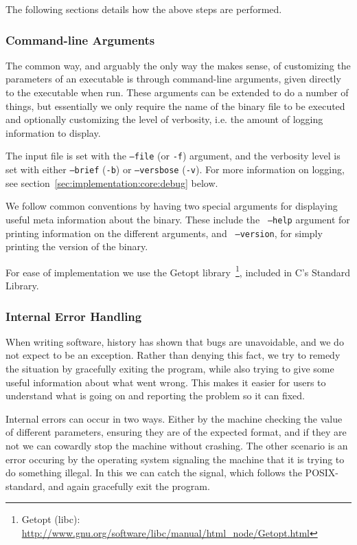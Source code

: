 The following sections details how the above steps are performed.

\subsubsection{Command-line Arguments}
The common way, and arguably the only way the makes sense, of customizing the
parameters of an executable is through command-line arguments, given directly to
the executable when run. These arguments can be extended to do a number of
things, but essentially we only require the name of the binary file to be
executed and optionally customizing the level of verbosity, i.e. the amount of
logging information to display. %

The input file is set with the {\tt --file} (or {\tt -f}) argument, and the
verbosity level is set with either {\tt --brief} ({\tt -b}) or {\tt--versbose}
({\tt -v}). For more information on logging, see
section~\ref{sec:implementation:core:debug} below.

We follow common conventions by having two special arguments for displaying
useful meta information about the \thename{} binary. These include the {\tt
  --help} argument for printing information on the different arguments, and {\tt
  --version}, for simply printing the version of the binary.

For ease of implementation we use the Getopt library~\footnote{Getopt (libc):
  \url{http://www.gnu.org/software/libc/manual/html_node/Getopt.html}}, included
in C's Standard Library.

\subsubsection{Internal Error Handling}

When writing software, history has shown that bugs are unavoidable, and we do
not expect \thename{} to be an exception. Rather than denying this fact, we try
to remedy the situation by gracefully exiting the program, while also trying to
give some useful information about what went wrong. This makes it easier for
users to understand what is going on and reporting the problem so it can fixed.

Internal errors can occur in two ways. Either by the machine checking the value
of different parameters, ensuring they are of the expected format, and if they
are not we can cowardly stop the machine without crashing. The other scenario is
an error occuring by the operating system signaling the machine that it is
trying to do something illegal. In this we can catch the signal, which follows
the POSIX-standard, and again gracefully exit the program.

